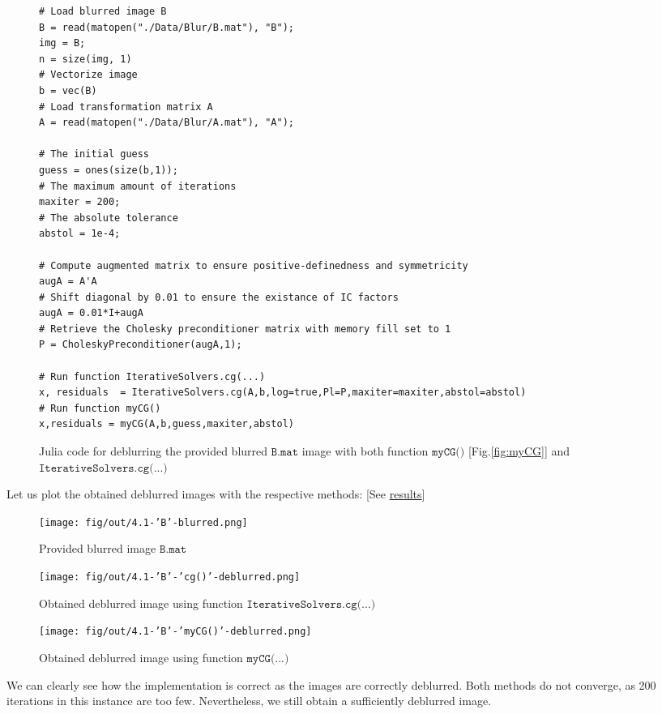 \documentclass[unicode,11pt,a4paper,oneside,numbers=endperiod,openany]{scrartcl}
\begin{document}
\begin{figure}[H]
\begin{verbatim}
# Load blurred image B
B = read(matopen("./Data/Blur/B.mat"), "B");
img = B;
n = size(img, 1)
# Vectorize image
b = vec(B)
# Load transformation matrix A
A = read(matopen("./Data/Blur/A.mat"), "A");

# The initial guess
guess = ones(size(b,1));
# The maximum amount of iterations
maxiter = 200;
# The absolute tolerance
abstol = 1e-4;

# Compute augmented matrix to ensure positive-definedness and symmetricity
augA = A'A
# Shift diagonal by 0.01 to ensure the existance of IC factors
augA = 0.01*I+augA
# Retrieve the Cholesky preconditioner matrix with memory fill set to 1
P = CholeskyPreconditioner(augA,1);

# Run function IterativeSolvers.cg(...)
x, residuals  = IterativeSolvers.cg(A,b,log=true,Pl=P,maxiter=maxiter,abstol=abstol)
# Run function myCG()
x,residuals = myCG(A,b,guess,maxiter,abstol)
\end{verbatim}
        \caption{Julia code for deblurring the provided blurred $\texttt{B.mat}$ image with both function $\texttt{myCG()}$ [Fig.\ref{fig:myCG}] and $\texttt{IterativeSolvers.cg(...)}$}
        \label{B_mat_deblur_JULIA}
\end{figure}


Let us plot the obtained deblurred images with the respective methods: [See \hyperref[fig:B_mat_deblur]{results}]

\begin{figure}[h!]
    \centering
    \begin{minipage}{.8\textwidth}
        \centering
        \texttt{[image: fig/out/4.1-'B'-blurred.png]}
        \caption{Provided blurred image $\texttt {B.mat}$}    
    \end{minipage}

    \begin{minipage}{.8\textwidth}
        \centering
        \texttt{[image: fig/out/4.1-'B'-'cg()'-deblurred.png]}
        \caption{\small Obtained deblurred image using function $\texttt {IterativeSolvers.cg(...)}$}
    \end{minipage}
    \begin{minipage}{.8\textwidth}
        \centering
        \texttt{[image: fig/out/4.1-'B'-'myCG()'-deblurred.png]}
        \caption{Obtained deblurred image using function $\texttt {myCG(...)}$}
    \end{minipage}
    \label{fig:B_mat_deblur}
\end{figure}
We can clearly see how the implementation is correct as the images are correctly deblurred. Both methods do not converge, as 200 iterations in this instance are too few. Nevertheless, we still obtain a sufficiently deblurred image.\\
\end{document}
